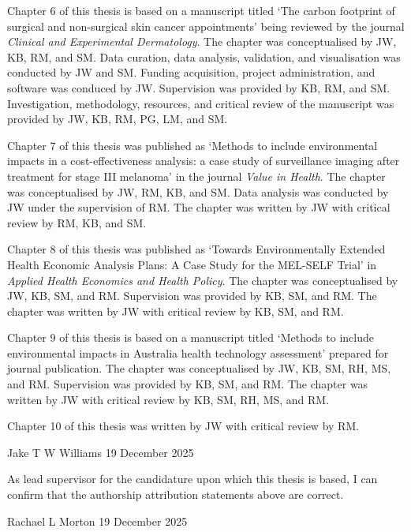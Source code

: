 Chapter 6 of this thesis is based on a manuscript titled `The carbon footprint of surgical and non-surgical skin cancer appointments' being reviewed by the journal \textit{Clinical and Experimental Dermatology}. The chapter was conceptualised by JW, KB, RM, and SM. Data curation, data analysis, validation, and visualisation was conducted by JW and SM. Funding acquisition, project administration, and software was conduced by JW. Supervision was provided by KB, RM, and SM. Investigation, methodology, resources, and critical review of the manuscript was provided by JW, KB, RM, PG, LM, and SM.

Chapter 7 of this thesis was published as `Methods to include environmental impacts in a cost-effectiveness analysis: a case study of surveillance imaging after treatment for stage III melanoma' in the journal \textit{Value in Health}. The chapter was conceptualised by JW, RM, KB, and SM. Data analysis was conducted by JW under the supervision of RM. The chapter was written by JW with critical review by RM, KB, and SM. 

Chapter 8 of this thesis was published as `Towards Environmentally Extended Health Economic Analysis Plans: A Case Study for the MEL-SELF Trial' in \textit{Applied Health Economics and Health Policy}. The chapter was conceptualised by JW, KB, SM, and RM. Supervision was provided by KB, SM, and RM. The chapter was written by JW with critical review by KB, SM, and RM.

Chapter 9 of this thesis is based on a manuscript titled `Methods to include environmental impacts in Australia health technology assessment' prepared for journal publication. The chapter was conceptualised by JW, KB, SM, RH, MS, and RM. Supervision was provided by KB, SM, and RM. The chapter was written by JW with critical review by KB, SM, RH, MS, and RM.

Chapter 10 of this thesis was written by JW with critical review by RM. 

\vspace{1cm}


Jake T W Williams \hspace{2cm} 19 December 2025

\vspace{1cm}

As lead supervisor for the candidature upon which this thesis is based, I can confirm that the
authorship attribution statements above are correct.


\vspace{1cm}

Rachael L Morton \hspace{2cm} 19 December 2025


